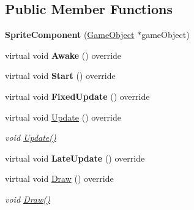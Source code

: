 \subsection*{Public Member Functions}
\begin{DoxyCompactItemize}
\item 
\mbox{\label{classrvl_1_1_sprite_component_ac9404ab15ecba2760e55eeabd38a7a0b}} 
{\bfseries Sprite\+Component} (\hyperlink{classrvl_1_1_game_object}{Game\+Object} $\ast$game\+Object)
\item 
\mbox{\label{classrvl_1_1_sprite_component_a971763a5c6a2761aabefe5680c761edf}} 
virtual void {\bfseries Awake} () override
\item 
\mbox{\label{classrvl_1_1_sprite_component_aa5fb5e3ccf189801a2959f24692f1e39}} 
virtual void {\bfseries Start} () override
\item 
\mbox{\label{classrvl_1_1_sprite_component_af977fbbeb3e4031e42c49bcec6ba5527}} 
virtual void {\bfseries Fixed\+Update} () override
\item 
virtual void \hyperlink{classrvl_1_1_sprite_component_a819d12d21a21382bba1cda032ebd8eb1}{Update} () override
\begin{DoxyCompactList}\small\item\em void \hyperlink{classrvl_1_1_sprite_component_a819d12d21a21382bba1cda032ebd8eb1}{Update()} \end{DoxyCompactList}\item 
\mbox{\label{classrvl_1_1_sprite_component_ac001f2457deb235f4f3f310c0b3ae992}} 
virtual void {\bfseries Late\+Update} () override
\item 
virtual void \hyperlink{classrvl_1_1_sprite_component_a40bd8ef0e0334620e36f164fcff0b650}{Draw} () override
\begin{DoxyCompactList}\small\item\em void \hyperlink{classrvl_1_1_sprite_component_a40bd8ef0e0334620e36f164fcff0b650}{Draw()} \end{DoxyCompactList}\item 
\mbox{\label{classrvl_1_1_sprite_component_a22f7622391d28488749df6679c0b0feb}} 

\end{DoxyCompactItemize}
